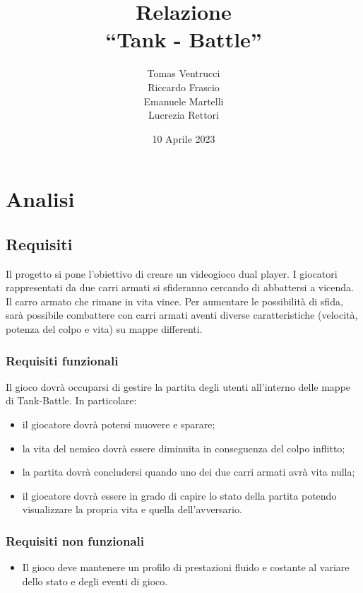 \documentclass[a4paper,12pt]{report}
\title{Relazione \\``Tank - Battle''}
\author{Tomas Ventrucci \\Riccardo Frascio \\Emanuele Martelli \\Lucrezia Rettori}
\date{10 Aprile 2023}
\begin{document}
\maketitle

\tableofcontents

\chapter{Analisi}

\section{Requisiti}
Il progetto si pone l’obiettivo di creare un videogioco dual player. I giocatori rappresentati da due carri armati si sfideranno cercando di abbattersi a vicenda. Il carro armato che rimane in vita vince. Per aumentare le possibilità di sfida, sarà possibile combattere con carri armati aventi diverse caratteristiche (velocità, potenza del colpo e vita) su mappe differenti.

\subsection*{Requisiti funzionali}
Il gioco dovrà occuparsi di gestire la partita degli utenti all’interno delle mappe di Tank-Battle. In particolare:
    \begin{itemize}
        \item il giocatore dovrà potersi muovere e sparare;
        \item la vita del nemico dovrà essere diminuita in conseguenza del colpo inflitto;
        \item la partita dovrà concludersi quando uno dei due carri armati avrà vita nulla;
        \item il giocatore dovrà essere in grado di capire lo stato della partita potendo visualizzare la propria vita e quella dell'avversario.
    \end{itemize}
\subsection*{Requisiti non funzionali}
\begin{itemize}
	\item Il gioco deve mantenere un profilo di prestazioni fluido e costante al variare dello stato e degli eventi di gioco.
\end{itemize}
\newpage
\end{document}
